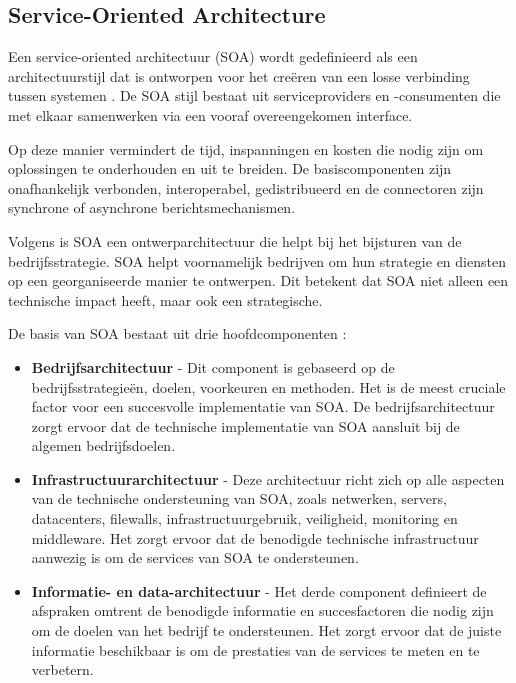\subsection{Service-Oriented Architecture}
\label{sec:SOA_architectuur}

Een service-oriented architectuur (SOA) wordt gedefinieerd als een architectuurstijl dat is ontworpen voor het creëren van een losse verbinding tussen systemen \autocite{Rojas2021}. De SOA stijl bestaat uit serviceproviders en -consumenten die met elkaar samenwerken via een vooraf overeengekomen interface. 

Op deze manier vermindert de tijd, inspanningen en kosten die nodig zijn om oplossingen te onderhouden en uit te breiden. De basiscomponenten zijn onafhankelijk verbonden, interoperabel, gedistribueerd en de connectoren zijn synchrone of asynchrone berichtsmechanismen.\newline

Volgens \textcite{Muhardany2020} is SOA een ontwerparchitectuur die helpt bij het bijsturen van de bedrijfsstrategie. SOA helpt voornamelijk bedrijven om hun strategie en diensten op een georganiseerde manier te ontwerpen. Dit betekent dat SOA niet alleen een technische impact heeft, maar ook een strategische.

De basis van SOA bestaat uit drie hoofdcomponenten \autocite{Muhardany2020}:

\begin{itemize}
	\item \textbf{Bedrijfsarchitectuur} - Dit component is gebaseerd op de bedrijfsstrategieën, doelen, voorkeuren en methoden. Het is de meest cruciale factor voor een succesvolle implementatie van SOA. De bedrijfsarchitectuur zorgt ervoor dat de technische implementatie van SOA aansluit bij de algemen bedrijfsdoelen.
	\item \textbf{Infrastructuurarchitectuur} - Deze architectuur richt zich op alle aspecten van de technische ondersteuning van SOA, zoals netwerken, servers, datacenters, filewalls, infrastructuurgebruik, veiligheid, monitoring en middleware. Het zorgt ervoor dat de benodigde technische infrastructuur aanwezig is om de services van SOA te ondersteunen.
	\item \textbf{Informatie- en data-architectuur} - Het derde component definieert de afspraken omtrent de benodigde informatie en succesfactoren die nodig zijn om de doelen van het bedrijf te ondersteunen. Het zorgt ervoor dat de juiste informatie beschikbaar is om de prestaties van de services te meten en te verbetern.
\end{itemize}

